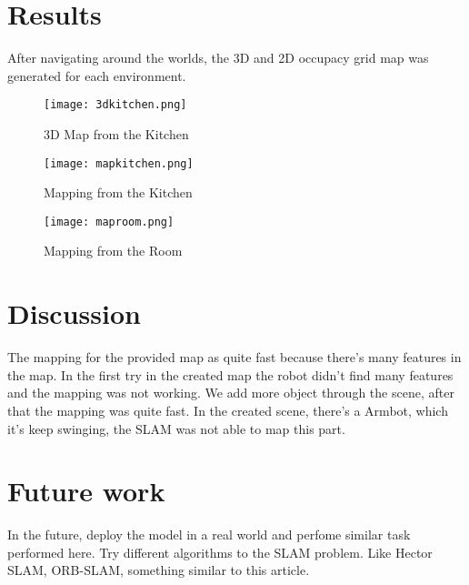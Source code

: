 \documentclass[10pt,journal,compsoc]{IEEEtran}
\begin{document}
\section{Results}

After navigating around the worlds, the 3D and 2D occupacy grid map was generated for each environment. 

\begin{figure}[thpb]
      \centering
      \texttt{[image: 3dkitchen.png]}
      \caption{3D Map from the Kitchen}
\end{figure}

\begin{figure}[thpb]
      \centering
      \texttt{[image: mapkitchen.png]}
      \caption{Mapping from the Kitchen}
\end{figure}

\begin{figure}[thpb]
      \centering
      \texttt{[image: maproom.png]}

      \caption{Mapping from the Room}
\end{figure}

\section{Discussion}

The mapping for the provided map as quite fast because there's many features in the map. In the first try in the created
map the robot didn't find many features and the mapping was not working. We add more object through the scene, after
that the mapping was quite fast.
In the created scene, there's a Armbot, which it's keep swinging, the SLAM was not able to map this part.
\section{Future work}

    In the future, deploy the model in a real world and perfome similar task performed here.
    Try different algorithms to the SLAM problem. Like Hector SLAM, ORB-SLAM, something similar to this article\cite{VehicularTechnologySociety2017}.


\nocite{*}


\end{document}
